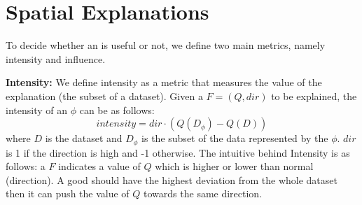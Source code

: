 
\section{Spatial Explanations}

To decide whether an {\explanation} is useful or not, we define two main metrics, namely intensity and influence. 

{\bf Intensity:} We define intensity as a metric that measures the {\fact} value of the explanation (the subset of a dataset). Given a {\fact} $F=(Q, dir)$ to be explained, the intensity of an {\explanation} $\phi$ can be as follows:
$$intensity = dir \cdot (Q (D_\phi) - Q(D)) $$
where $D$ is the dataset and $D_\phi$ is the subset of the data represented by the {\explanation} $\phi$. $dir$ is 1 if the direction is high and -1 otherwise. 
The intuitive behind Intensity is as follows: a {\fact} $F$ indicates a value of $Q$ which is higher or lower than normal (direction). A good {\explanation} should have the highest deviation from the whole dataset then it can push the value of $Q$ towards the same direction. 


